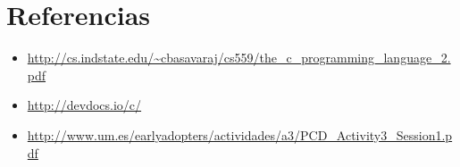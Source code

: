 \documentclass[12pt,letterpaper]{article}
\begin{document}
\section{Referencias}
  \begin{itemize}
    \item \url{http://cs.indstate.edu/~cbasavaraj/cs559/the_c_programming_language_2.pdf}
    \item \url {http://devdocs.io/c/}
    \item \url{http://www.um.es/earlyadopters/actividades/a3/PCD_Activity3_Session1.pdf}
  \end{itemize}	
\end{document}

